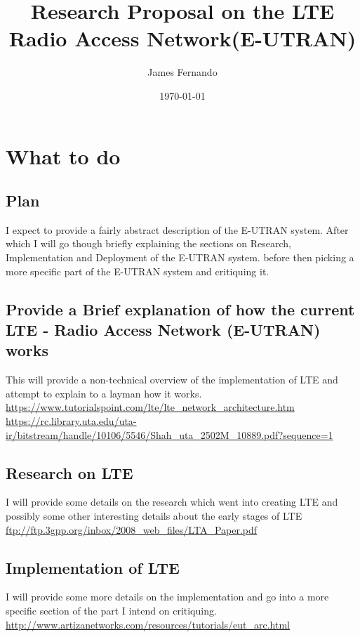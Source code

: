 \documentclass[a4paper,12pt]{scrartcl}
\title{Research Proposal on the LTE Radio Access Network(E-UTRAN)}
\author{James Fernando}
\date{\today}
\begin{document}
	
	\begin{titlepage}
		\maketitle
	\end{titlepage}
	
	\tableofcontents
	\newpage	
	\section{What to do}
	{
		\subsection{Plan}{
			I expect to provide a fairly abstract description of the E-UTRAN system. After which I will go though briefly explaining the sections on Research, Implementation and Deployment of the E-UTRAN system. before then picking a more specific part of the E-UTRAN system and critiquing it.
		
		\subsection{Provide a Brief explanation of how the current LTE - Radio Access Network (E-UTRAN) works}
		{
			This will provide a non-technical overview of the implementation of LTE and attempt to explain to a layman how it works.
			\url{https://www.tutorialspoint.com/lte/lte_network_architecture.htm}
			\url{https://rc.library.uta.edu/uta-ir/bitstream/handle/10106/5546/Shah_uta_2502M_10889.pdf?sequence=1}
		}
		\subsection{Research on LTE}
		{
			I will provide some details on the research which went into creating LTE and possibly some other interesting details about the early stages of LTE
			\url{ftp://ftp.3gpp.org/inbox/2008_web_files/LTA_Paper.pdf}
		}
		\subsection{Implementation of LTE}
		{
			I will provide some more details on the implementation and go into a more specific section of the part I intend on critiquing. 
			\url{http://www.artizanetworks.com/resources/tutorials/eut_arc.html}
		}
}}
\end{document}
